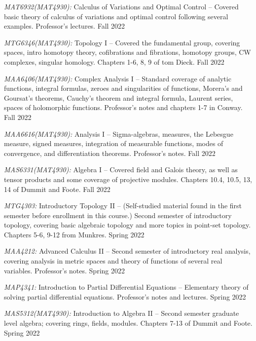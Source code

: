 \documentclass[11pt]{article}
\begin{document}
\textsl{MAT6932(MAT4930)\textsuperscript{\textdagger}:} Calculus of Variations and Optimal Control -- Covered basic theory of calculus of variations and optimal control following several examples. Professor's lectures. Fall 2022

\textsl{MTG6346(MAT4930)\textsuperscript{\textdagger}:} Topology I -- Covered the fundamental group, covering spaces, intro homotopy theory, cofibrations and fibrations, homotopy groups, CW complexes, singular homology. Chapters 1-6, 8, 9 of tom Dieck. Fall 2022

\textsl{MAA6406(MAT4930)\textsuperscript{\textdagger}:} Complex Analysis I -- Standard coverage of analytic functions, integral formulas, zeroes and singularities of functions, Morera's and Goursat's theorems, Cauchy's theorem and integral formula, Laurent series, spaces of holomorphic functions. Professor's notes and chapters 1-7 in Conway. Fall 2022

\textsl{MAA6616(MAT4930)\textsuperscript{\textdagger}:} Analysis I -- Sigma-algebras, measures, the Lebesgue measure, signed measures, integration of measurable functions, modes of convergence, and differentiation theorems. Professor's notes. Fall 2022

\textsl{MAS6331(MAT4930)\textsuperscript{\textdagger}:} Algebra I -- Covered field and Galois theory, as well as tensor products and some coverage of projective modules. Chapters 10.4, 10.5, 13, 14 of Dummit and Foote. Fall 2022

\textsl{MTG4303\textsuperscript{\textdagger}:} Introductory Topology II -- (Self-studied material found in the first semester before enrollment in this course.) Second semester of introductory topology, covering basic algebraic topology and more topics in point-set topology. Chapters 5-6, 9-12 from Munkres. Spring 2022

\textsl{MAA4212:} Advanced Calculus II -- Second semester of introductory real analysis, covering analysis in metric spaces and theory of functions of several real variables. Professor's notes. Spring 2022

\textsl{MAP4341\textsuperscript{\textdagger}:} Introduction to Partial Differential Equations -- Elementary theory of solving partial differential equations. Professor's notes and lectures. Spring 2022

\textsl{MAS5312(MAT4930)\textsuperscript{\textdagger}:} Introduction to Algebra II -- Second semester graduate level algebra; covering rings, fields, modules. Chapters 7-13 of Dummit and Foote. Spring 2022
\end{document}

